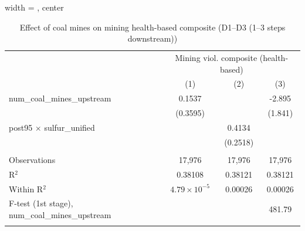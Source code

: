 
\begin{table}[htbp]
   
   \caption{\label{2sls_4step_d1_d3_mining_healthbased} Effect of coal mines on mining health-based composite (D1--D3 (1--3 steps downstream))}
   \bigskip
   
   \centering
   
   \begin{adjustbox}{width = \textwidth, center}
      
      
      \begin{tabular}{lccc}
         \toprule
         
          & \multicolumn{3}{c}{Mining viol. composite (health-based)}\\
         
                                                           & (1)                   & (2)           & (3)\\  
         
         \midrule 
         num\_coal\_mines\_upstream                        & 0.1537                &               & -2.895\\   
                                                           & (0.3595)              &               & (1.841)\\   
         post95 $\times$ sulfur\_unified                   &                       & 0.4134        &   \\   
                                                           &                       & (0.2518)      &   \\   
         
          \\
         
         Observations                                      & 17,976                & 17,976        & 17,976\\  
         R$^2$                                             & 0.38108               & 0.38121       & 0.38121\\  
         Within R$^2$                                      & $4.79\times 10^{-5}$  & 0.00026       & 0.00026\\  
         F-test (1st stage), num\_coal\_mines\_upstream    &                       &               & 481.79\\  
         
          \\
         

\end{tabular}
\end{adjustbox}
\end{table}
